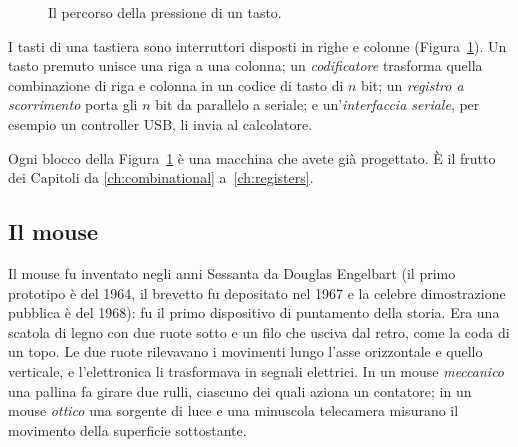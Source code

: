 \begin{figure}[htb]
\centering
{}
\caption{Il percorso della pressione di un tasto.}
\label{fig:io:key}
\end{figure}

I tasti di una tastiera sono interruttori disposti in righe e colonne
(Figura~\ref{fig:io:key}). Un tasto premuto unisce una riga a una colonna; un
\emph{codificatore} trasforma quella combinazione di riga e colonna in un
codice di tasto di $n$ bit; un \emph{registro a scorrimento} porta gli $n$ bit
da parallelo a seriale; e un'\emph{interfaccia seriale}, per esempio un
controller USB, li invia al calcolatore.

\begin{prgconcept}
Ogni blocco della Figura~\ref{fig:io:key} è una macchina che avete già
progettato. È il frutto dei Capitoli da \ref{ch:combinational}
a~\ref{ch:registers}.
\end{prgconcept}

\subsection{Il mouse}

Il mouse fu inventato negli anni Sessanta da Douglas Engelbart (il primo
prototipo è del 1964, il brevetto fu depositato nel 1967 e la celebre
dimostrazione pubblica è del 1968): fu il primo dispositivo di puntamento
della storia. Era una scatola di legno con due ruote sotto e un filo che
usciva dal retro, come la coda di un topo. Le due ruote rilevavano i movimenti
lungo l'asse orizzontale e quello verticale, e l'elettronica li trasformava in
segnali elettrici. In un mouse \emph{meccanico} una pallina fa girare due
rulli, ciascuno dei quali aziona un contatore; in un mouse \emph{ottico} una
sorgente di luce e una minuscola telecamera misurano il movimento della
superficie sottostante.

